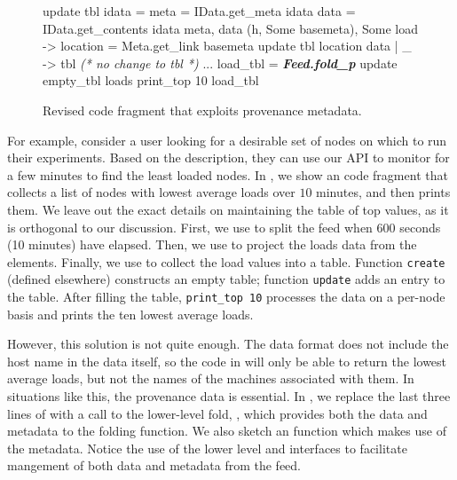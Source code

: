 \begin{figure}[tb]

\begin{codebox}
 update tbl idata =
   meta = IData.get_meta idata 
   data = IData.get_contents idata 
   meta, data  
    (h, Some basemeta), Some load ->
       location = Meta.get_link basemeta 
      update tbl location data
  | _ -> tbl \textit{ (* no change to tbl *)}
 ...
 load_tbl = \textit{\textbf{Feed.fold_p}} update empty_tbl loads
 print_top 10 load_tbl
\end{codebox}
  \caption{Revised code fragment that exploits provenance metadata. }
\label{fig:sample-loads-prov}
\end{figure}

For example, consider a \planetlab user looking for a desirable set of
nodes on which to run their experiments. Based on the \comon
description, they can use our API to monitor \planetlab for a few
minutes to find the least loaded nodes. In ,
we show an \ocaml code fragment that collects a list of nodes with
lowest average loads over $10$ minutes, and then prints them. We leave
out the exact details on maintaining the table of top values, as it is
orthogonal to our discussion. First, we use  to
split the feed when 600 seconds (10 minutes) have elapsed. Then, we
use  to project the loads data from the\comon
elements. Finally, we use  to collect the load values
into a table. Function \texttt{create} (defined elsewhere)
constructs an empty table; function 
\texttt{update} adds an entry to the table.
After filling the table, \texttt{print\_top 10}
processes the data on a per-node basis
and prints the ten lowest average loads.

However, this solution is not quite enough. The \comon data format
does not include the host name in the data itself, so the code in
 will only be able to return the lowest
average loads, but not the names of the machines associated with
them. In situations like this, the provenance data is essential.  In
, we replace the last three lines of
 with a call to the lower-level fold,
, which provides both the data and metadata to the folding
function. We also sketch an  function which makes use of 
the metadata.   Notice the use of the lower level  and
 interfaces to facilitate mangement of both data and 
metadata from the feed. 

